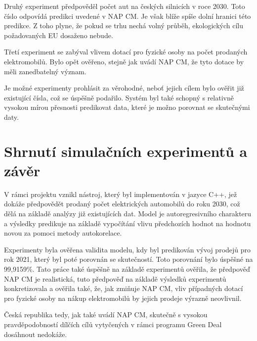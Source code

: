\documentclass[14pt]{extarticle}
\begin{document}
    
    Druhý experiment předpověděl počet aut na českých silnicích v roce 2030. Toto číslo odpovídá predikci uvedené v NAP CM. Je však blíže spíše dolní hranici této predikce. Z toho plyne, že pokud se trhu nechá volný průběh, ekologických cílu požadovaných EU dosaženo nebude.
    
    
    Třetí experiment se zabýval vlivem dotací pro fyzické osoby na počet prodaných elektromobilů. Bylo opět ověřeno, stejně jak uvádí NAP CM, že tyto dotace by měli zanedbatelný význam. 
    
    
    Je možné experimenty prohlásit za věrohodné, neboť jejich cílem bylo ověřit již existující čísla, což se úspěšně podařilo. Systém byl také schopný s relativně vysokou mírou přesnosti predikovat data, které je možno porovnat se skutečnými daty.
    
    \section{Shrnutí simulačních experimentů a závěr}
    
    V rámci projektu vznikl nástroj, který byl implementován v jazyce C++, jež dokáže předpovědět prodaný počet elektrických automobilů do roku 2030, což dělá na základě analýzy již existujících dat. Model je autoregresivního charakteru a výsledky predikuje na základě vypočítání vlivu předchozích hodnot na hodnotu novou za pomoci metody autokorelace.
    
    Experimenty byla ověřena validita modelu, kdy byl predikován vývoj prodejů pro rok 2021, který byl poté porovnán se skutečností. Toto porovnání bylo úspěšné na 99,9159\%. Tato práce také úspěšně na základě experimentů ověřila, že předpověď NAP CM je realistická, tuto předpověď na základě výsledků experimentů konkretizovala a ověřila také, že, jak zmiňuje NAP CM, vliv případných dotací pro fyzické osoby na nákup elektromobilů by jejich prodeje výrazně neovlivnil.
    
    
    Česká republika tedy, jak také uvádí NAP CM, skutečně s vysokou pravděpo\-dobností dílčích cílů vytyčených v rámci programu Green Deal dosáhnout nedokáže.
    
    \newpage
    
    \renewcommand{\refname}{Literatura}
    
    
    	
\end{document}
